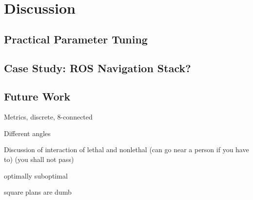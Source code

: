 \section{Discussion}
\subsection{Practical Parameter Tuning}
\subsection{Case Study: ROS Navigation Stack?}
\subsection{Future Work}
Metrics, discrete, 8-connected

Different angles

Discussion of interaction of lethal and nonlethal (can go near a person if you have to) (you shall not pass)

optimally suboptimal

square plans are dumb

